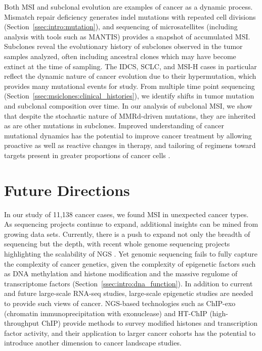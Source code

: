 Both MSI and subclonal evolution are examples of cancer as a dynamic process. Mismatch repair deficiency generates indel mutations with repeated cell divisions (Section~\ref{ssec:intro:mutation}), and sequencing of microsatellites (including analysis with tools such as MANTIS) provides a snapshot of accumulated MSI\@. Subclones reveal the evolutionary history of subclones observed in the tumor samples analyzed, often including ancestral clones which may have become extinct at the time of sampling. The IDCS, SCLC, and MSI-H cases in particular reflect the dynamic nature of cancer evolution due to their hypermutation, which provides many mutational events for study. From multiple time point sequencing (Section~\ref{ssec:msiclones:clinical_histories}), we identify shifts in tumor mutation and subclonal composition over time. In our analysis of subclonal MSI, we show that despite the stochastic nature of MMRd-driven mutations, they are inherited as are other mutations in subclones. Improved understanding of cancer mutational dynamics has the potential to improve cancer treatment by allowing proactive as well as reactive changes in therapy, and tailoring of regimens toward targets present in greater proportions of cancer cells \cite{hiley2014}.

\section{Future Directions}
In our study of 11,138 cancer cases, we found MSI in unexpected cancer types. As sequencing projects continue to expand, additional insights can be mined from growing data sets. Currently, there is a push to expand not only the breadth of sequencing but the depth, with recent whole genome sequencing projects highlighting the scalability of NGS \cite{cieslik2020}. Yet genomic sequencing fails to fully capture the complexity of cancer genetics, given the complexity of epigenetic factors such as DNA methylation and histone modification and the massive regulome of transcriptome factors (Section~\ref{ssec:intro:dna_function}). In addition to current and future large-scale RNA-seq studies, large-scale epigenetic studies are needed to provide such views of cancer. NGS-based technologies such as ChIP-exo (chromatin immunoprecipitation with exonuclease) \cite{rhee2012} and HT-ChIP (high-throughput ChIP) \cite{blechergonen2013} provide methods to survey modified histones and transcription factor activity, and their application to larger cancer cohorts has the potential to introduce another dimension to cancer landscape studies.

